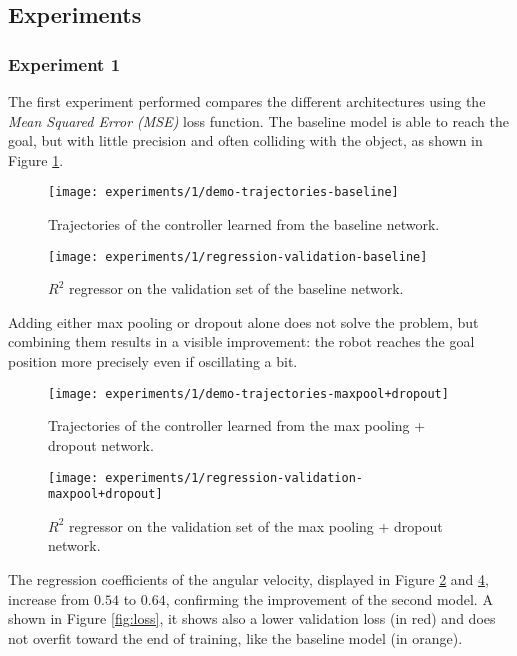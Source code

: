 \subsection{Experiments}
\subsubsection{Experiment 1}
The first experiment performed compares the different architectures using the 
\emph{Mean Squared Error (MSE)} loss 
function.
The baseline model is able to reach the goal, but with little precision and 
often colliding with the object, as shown 
in Figure \ref{fig:baseline}.

\begin{figure}[htbp]
	\centerline{\texttt{[image: experiments/1/demo-trajectories-baseline]}}
	\caption{Trajectories of the controller learned from the baseline network.}
	\label{fig:baseline}
\end{figure}

\begin{figure}[htbp]
	\centerline{\texttt{[image: experiments/1/regression-validation-baseline]}}
	\caption{$R^2$ regressor on the validation set of the baseline network.}
	\label{fig:regression-baseline}
\end{figure}


Adding either max pooling or dropout alone does not solve the problem, but 
combining them results in a visible 
improvement: the robot reaches the goal position more precisely even if 
oscillating a bit.

\begin{figure}[htbp]
	\centerline{\texttt{[image: experiments/1/demo-trajectories-maxpool+dropout]}}
	\caption{Trajectories of the controller learned from the max pooling + 
	dropout network.}
	\label{fig:maxpool+dropout}
\end{figure}

\begin{figure}[htbp]
	\centerline{\texttt{[image: experiments/1/regression-validation-maxpool+dropout]}}
	\caption{$R^2$ regressor on the validation set of the max pooling + dropout 
	network.}
	\label{fig:regression-maxpool+dropout}
\end{figure}

The regression coefficients of the angular velocity, displayed in Figure 
\ref{fig:regression-baseline} and \ref{fig:regression-maxpool+dropout}, 
increase from $0.54$ to $0.64$, confirming the improvement of the second model.
A shown in Figure \ref{fig:loss}, it shows also a lower validation loss (in 
red) and does not overfit toward the end of training, like the baseline model 
(in orange).

